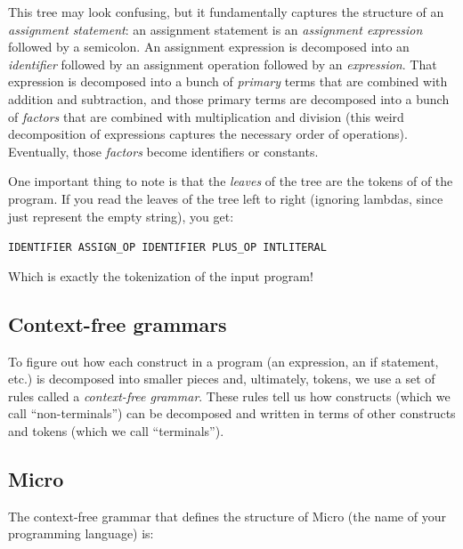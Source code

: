 \documentclass{article}
\begin{document}
This tree may look confusing, but it fundamentally captures the structure of an {\em assignment statement}: an assignment statement is an {\em assignment expression} followed by a semicolon. An assignment expression is decomposed into an {\em identifier} followed by an assignment operation followed by an {\em expression}. That expression is decomposed into a bunch of {\em primary} terms that are combined with addition and subtraction, and those primary terms are decomposed into a bunch of {\em factors} that are combined with multiplication and division (this weird decomposition of expressions captures the necessary order of operations). Eventually, those {\em factors} become identifiers or constants.

One important thing to note is that the {\em leaves} of the tree are the tokens of of the program. If you read the leaves of the tree left to right (ignoring lambdas, since just represent the empty string), you get:

\texttt{IDENTIFIER ASSIGN\_OP IDENTIFIER PLUS\_OP INTLITERAL}

Which is exactly the tokenization of the input program!

\subsection{Context-free grammars}
To figure out how each construct in a program (an expression, an if statement, etc.) is decomposed into smaller pieces and, ultimately, tokens, we use a set of rules called a {\em context-free grammar}. 
These rules tell us how constructs (which we call ``non-terminals'') can be decomposed and written in terms of other constructs and tokens (which we call ``terminals''). 

\subsection{Micro}
The context-free grammar that defines the structure of Micro (the name of your programming language) is:
\end{document}
